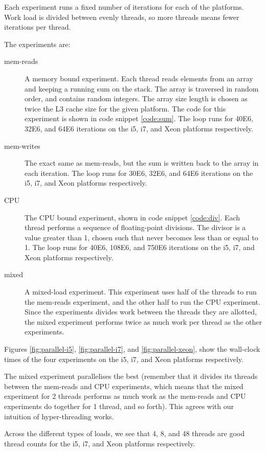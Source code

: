 Each experiment runs a fixed number of iterations for each of the platforms.
Work load is divided between evenly threads, so more threads means fewer
iterations per thread.

The experiments are:

\begin{description}
	\item [mem-reads] A memory bound experiment. Each thread reads elements
		from an array and keeping a running sum on the stack. The array
		is traversed in random order, and contains random integers. The
		array size length is chosen as twice the L3 cache size for the
		given platform. The code for this experiment is shown in code
		snippet \ref{code:sum}. The loop runs for 40E6, 32E6, and 64E6
		iterations on the i5, i7, and Xeon platforms respectively.
	\item [mem-writes] The exact same as mem-reads, but the sum is written
		back to the array in each iteration.
		The loop runs for 30E6, 32E6, and 64E6 iterations on the i5, i7,
		and Xeon platforms respectively.
	\item [CPU] The CPU bound experiment, shown in code snippet
		\ref{code:div}. Each thread performs a sequence of
		floating-point divisions.
		The divisor is a value greater than 1, chosen such that 
		never becomes less than or equal to 1.
		The loop runs for 40E6, 108E6, and 750E6 iterations on the i5,
		i7, and Xeon platforms respectively.
	\item [mixed] A mixed-load experiment. This experiment uses half of the
		threads to run the mem-reads experiment, and the other half to
		run the CPU experiment. Since the experiments divides work
		between the threads they are allotted, the mixed experiment
		performs twice as much work per thread as the other experiments.
\end{description}

Figures \ref{fig:parallel-i5}, \ref{fig:parallel-i7}, and
\ref{fig:parallel-xeon}, show the wall-clock times of the four experiments on
the i5, i7, and Xeon platforms respectively.

The mixed experiment parallelises the best (remember that it divides its threads
between the mem-reads and CPU experiments, which means that the mixed experiment
for 2 threads performs as much work as the mem-reads and CPU experiments do
together for 1 thread, and so forth). This agrees with our intuition of
hyper-threading works.

Across the different types of loads, we see that 4, 8, and 48 threads are good
thread counts for the i5, i7, and Xeon platforms respectively.

